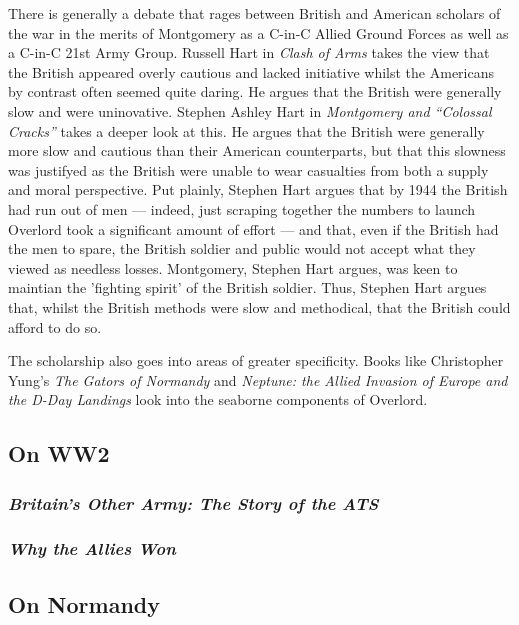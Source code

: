 \documentclass[noraggedright]{turabian-researchpaper}
\begin{document}
There is generally a debate that rages between British and American scholars
of the war in the merits of Montgomery as a C-in-C Allied Ground Forces as
well as a C-in-C 21st Army Group.  Russell Hart in \textit{Clash of Arms} takes
the view that the British appeared overly cautious and lacked initiative whilst 
the Americans by contrast often seemed quite daring.%
He argues that the British were generally slow and
were uninovative.  Stephen Ashley Hart in \textit{Montgomery and ``Colossal
Cracks''} takes a deeper look at this.  He argues that the British were 
generally more slow and cautious than their American counterparts, but that 
this slowness was justifyed as the British were unable to wear casualties from
both a supply and moral perspective.  Put plainly, Stephen Hart argues that by 
1944 the British had run out of men --- indeed, just scraping together the 
numbers to launch Overlord took a significant amount of effort\autocite[56-7]
{cracks}
--- and that, even if the British had the men to spare, the British soldier 
and public would not accept what they 
viewed as needless losses.\autocite[24-5]{cracks}  
Montgomery, Stephen Hart argues, was keen to maintian the 'fighting spirit'
of the British soldier.  Thus, Stephen Hart argues that, whilst the British
methods were slow and methodical, that the British could afford to do so.  

The scholarship also goes into areas of greater specificity.  Books like 
Christopher Yung's \textit{The Gators of Normandy} and \textit{Neptune:
the Allied Invasion of Europe and the D-Day Landings} look into the seaborne
components of Overlord.  

	\subsection{On WW2} %
		\subsubsection{\textit{Britain's Other Army:  The Story of
			the ATS}}
		\subsubsection{\textit{Why the Allies Won}}

	\subsection{On Normandy}
\end{document}

